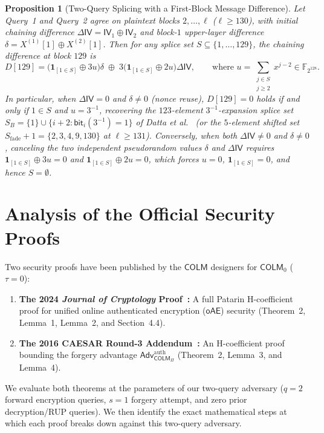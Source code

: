\documentclass[11pt,a4paper]{article}
\newtheorem{proposition}{Proposition}
\theoremstyle{definition}
\theoremstyle{remark}
\newcommand{\FtwoN}{\mathbb{F}_{2^{128}}}
\newcommand{\COLM}{\mathsf{COLM}}
\newcommand{\COLMzero}{\mathsf{COLM}_0}
\newcommand{\IV}{\mathsf{IV}}
\newcommand{\Adv}{\mathsf{Adv}}
\begin{document}
\begin{proposition}[Two-Query Splicing with a First-Block Message Difference]
\label{prop:case-c}
Let Query~1 and Query~2 agree on plaintext blocks $2, \dots, \ell$ ($\ell \ge 130$), with initial chaining difference $\Delta\IV = \IV_1 \oplus \IV_2$ and block-$1$ upper-layer difference $\delta = X^{(1)}[1] \oplus X^{(2)}[1]$. Then for any splice set $S \subseteq \{1, \dots, 129\}$, the chaining difference at block $129$ is
\begin{equation}
\label{eq:D-two-unknowns}
D[129] = \Big(\mathbf{1}_{[1 \in S]} \oplus 3u\Big) \delta \;\oplus\; 3\Big(\mathbf{1}_{[1 \in S]} \oplus 2u\Big) \Delta\IV, \qquad \text{where } u = \sum_{\substack{j \in S \\ j \ge 2}} x^{j-2} \in \FtwoN.
\end{equation}
In particular, when $\Delta\IV = 0$ and $\delta \neq 0$ (nonce reuse), $D[129] = 0$ holds if and only if $1 \in S$ and $u = 3^{-1}$, recovering the $123$-element $3^{-1}$-expansion splice set $S_B = \{1\} \cup \{i + 2 : \mathsf{bit}_i(3^{-1}) = 1\}$ of Datta et al.~\cite[Lemma~2]{DLMN17} (or the $5$-element shifted set $S_{\mathrm{fade}} + 1 = \{2, 3, 4, 9, 130\}$ at $\ell \ge 131$). Conversely, when both $\Delta\IV \neq 0$ and $\delta \neq 0$, canceling the two independent pseudorandom values $\delta$ and $\Delta\IV$ requires $\mathbf{1}_{[1 \in S]} \oplus 3u = 0$ and $\mathbf{1}_{[1 \in S]} \oplus 2u = 0$, which forces $u = 0$, $\mathbf{1}_{[1 \in S]} = 0$, and hence $S = \emptyset$.
\end{proposition}

\section{Analysis of the Official Security Proofs}
\label{sec:proof-flaw}

Two security proofs have been published by the $\COLM$ designers for $\COLMzero$ ($\tau = 0$):
\begin{enumerate}[leftmargin=2em]
    \item \textbf{The 2024 \emph{Journal of Cryptology} Proof~\cite[Section~4, pp.~15--25]{COLM24}:} A full Patarin H-coefficient proof for unified online authenticated encryption ($\mathsf{oAE}$) security (Theorem~2, Lemma~1, Lemma~2, and Section~4.4).
    \item \textbf{The 2016 CAESAR Round-3 Addendum~\cite[Section~2, pp.~2--4]{COLMadd}:} An H-coefficient proof bounding the forgery advantage $\Adv^{\mathrm{auth}}_{\COLM_\Pi}$ (Theorem~2, Lemma~3, and Lemma~4).
\end{enumerate}
We evaluate both theorems at the parameters of our two-query adversary ($q = 2$ forward encryption queries, $s = 1$ forgery attempt, and zero prior decryption/RUP queries). We then identify the exact mathematical steps at which each proof breaks down against this two-query adversary.
\end{document}
